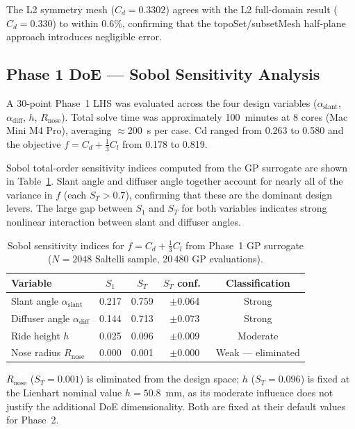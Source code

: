 The L2 symmetry mesh ($C_d = 0.3302$) agrees with the L2 full-domain result ($C_d = 0.330$) to within 0.6\%, confirming that the topoSet/subsetMesh half-plane approach introduces negligible error.

\subsection{Phase 1 DoE — Sobol Sensitivity Analysis}
\label{sec:sobol_results}

A 30-point Phase~1 LHS was evaluated across the four design variables ($\alpha_\mathrm{slant}$, $\alpha_\mathrm{diff}$, $h$, $R_\mathrm{nose}$). Total solve time was approximately 100~minutes at 8 cores (Mac Mini M4 Pro), averaging $\approx$200~s per case. Cd ranged from 0.263 to 0.580 and the objective $f = C_d + \tfrac{1}{3}C_l$ from 0.178 to 0.819.

Sobol total-order sensitivity indices computed from the GP surrogate are shown in Table~\ref{tab:sobol}. Slant angle and diffuser angle together account for nearly all of the variance in $f$ (each $S_T > 0.7$), confirming that these are the dominant design levers. The large gap between $S_1$ and $S_T$ for both variables indicates strong nonlinear interaction between slant and diffuser angles.

\begin{table}[h]
    \centering
    \caption{Sobol sensitivity indices for $f = C_d + \tfrac{1}{3}C_l$ from Phase~1 GP surrogate ($N=2048$ Saltelli sample, 20\,480 GP evaluations).}
    \label{tab:sobol}
    \begin{tabular}{lcccc}
        \toprule
        Variable & $S_1$ & $S_T$ & $S_T$ conf.\ & Classification \\
        \midrule
        Slant angle $\alpha_\mathrm{slant}$   & 0.217 & 0.759 & $\pm$0.064 & Strong \\
        Diffuser angle $\alpha_\mathrm{diff}$ & 0.144 & 0.713 & $\pm$0.073 & Strong \\
        Ride height $h$                        & 0.025 & 0.096 & $\pm$0.009 & Moderate \\
        Nose radius $R_\mathrm{nose}$          & 0.000 & 0.001 & $\pm$0.000 & Weak — eliminated \\
        \bottomrule
    \end{tabular}
\end{table}

$R_\mathrm{nose}$ ($S_T = 0.001$) is eliminated from the design space; $h$ ($S_T = 0.096$) is fixed at the Lienhart nominal value $h = 50.8$~mm, as its moderate influence does not justify the additional DoE dimensionality. Both are fixed at their default values for Phase~2.

